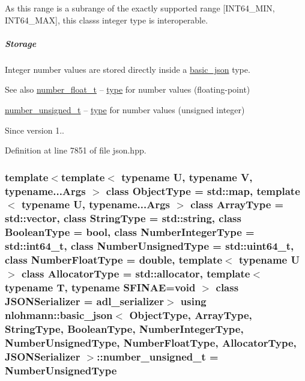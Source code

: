 As this range is a subrange of the exactly supported range \mbox{[}I\+N\+T64\+\_\+\+M\+IN, I\+N\+T64\+\_\+\+M\+AX\mbox{]}, this class\textquotesingle{}s integer type is interoperable.

\subparagraph*{Storage}

Integer number values are stored directly inside a \hyperlink{classnlohmann_1_1basic__json}{basic\+\_\+json} type.

\begin{DoxySeeAlso}{See also}
\hyperlink{classnlohmann_1_1basic__json_a88d6103cb3620410b35200ee8e313d97}{number\+\_\+float\+\_\+t} -- \hyperlink{classnlohmann_1_1basic__json_a2b2d781d7f2a4ee41bc0016e931cadf7}{type} for number values (floating-\/point)

\hyperlink{classnlohmann_1_1basic__json_ab906e29b5d83ac162e823ada2156b989}{number\+\_\+unsigned\+\_\+t} -- \hyperlink{classnlohmann_1_1basic__json_a2b2d781d7f2a4ee41bc0016e931cadf7}{type} for number values (unsigned integer)
\end{DoxySeeAlso}
\begin{DoxySince}{Since}
version 1.. 
\end{DoxySince}


Definition at line 7851 of file json.\+hpp.

\subsubsection[{\texorpdfstring{number\+\_\+unsigned\+\_\+t}{number_unsigned_t}}]{\setlength{\rightskip}{0pt plus 5cm}template$<$template$<$ typename U, typename V, typename...\+Args $>$ class Object\+Type = std\+::map, template$<$ typename U, typename...\+Args $>$ class Array\+Type = std\+::vector, class String\+Type  = std\+::string, class Boolean\+Type  = bool, class Number\+Integer\+Type  = std\+::int64\+\_\+t, class Number\+Unsigned\+Type  = std\+::uint64\+\_\+t, class Number\+Float\+Type  = double, template$<$ typename U $>$ class Allocator\+Type = std\+::allocator, template$<$ typename T, typename S\+F\+I\+N\+A\+E=void $>$ class J\+S\+O\+N\+Serializer = adl\+\_\+serializer$>$ using {\bf nlohmann\+::basic\+\_\+json}$<$ Object\+Type, Array\+Type, String\+Type, Boolean\+Type, Number\+Integer\+Type, Number\+Unsigned\+Type, Number\+Float\+Type, Allocator\+Type, J\+S\+O\+N\+Serializer $>$\+::{\bf number\+\_\+unsigned\+\_\+t} =  Number\+Unsigned\+Type}\hypertarget{classnlohmann_1_1basic__json_ab906e29b5d83ac162e823ada2156b989}{}\label{classnlohmann_1_1basic__json_ab906e29b5d83ac162e823ada2156b989}


